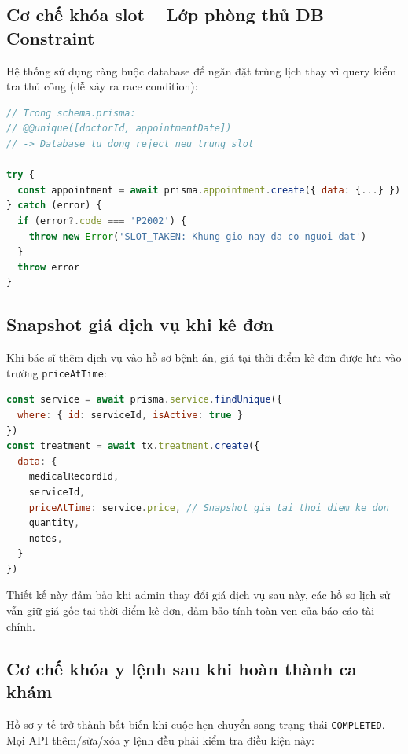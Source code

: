 \documentclass[14pt,a4paper]{report}
\begin{document}
\subsection{Cơ chế khóa slot -- Lớp phòng thủ DB Constraint}

Hệ thống sử dụng ràng buộc database để ngăn đặt trùng lịch thay vì
query kiểm tra thủ công (dễ xảy ra race condition):

\begin{lstlisting}[language=JavaScript, caption={Xử lý P2002 -- Unique constraint phòng double-booking}]
// Trong schema.prisma:
// @@unique([doctorId, appointmentDate])
// -> Database tu dong reject neu trung slot

try {
  const appointment = await prisma.appointment.create({ data: {...} })
} catch (error) {
  if (error?.code === 'P2002') {
    throw new Error('SLOT_TAKEN: Khung gio nay da co nguoi dat')
  }
  throw error
}
\end{lstlisting}

\subsection{Snapshot giá dịch vụ khi kê đơn}

Khi bác sĩ thêm dịch vụ vào hồ sơ bệnh án, giá tại thời điểm kê
đơn được lưu vào trường \texttt{priceAtTime}:

\begin{lstlisting}[language=JavaScript, caption={Snapshot giá dịch vụ -- đảm bảo tính bất biến lịch sử}]
const service = await prisma.service.findUnique({
  where: { id: serviceId, isActive: true }
})
const treatment = await tx.treatment.create({
  data: {
    medicalRecordId,
    serviceId,
    priceAtTime: service.price, // Snapshot gia tai thoi diem ke don
    quantity,
    notes,
  }
})
\end{lstlisting}

Thiết kế này đảm bảo khi admin thay đổi giá dịch vụ sau này, các
hồ sơ lịch sử vẫn giữ giá gốc tại thời điểm kê đơn, đảm bảo tính
toàn vẹn của báo cáo tài chính.

\subsection{Cơ chế khóa y lệnh sau khi hoàn thành ca khám}

Hồ sơ y tế trở thành bất biến khi cuộc hẹn chuyển sang trạng thái
\texttt{COMPLETED}. Mọi API thêm/sửa/xóa y lệnh đều phải kiểm tra
điều kiện này:
\end{document}
